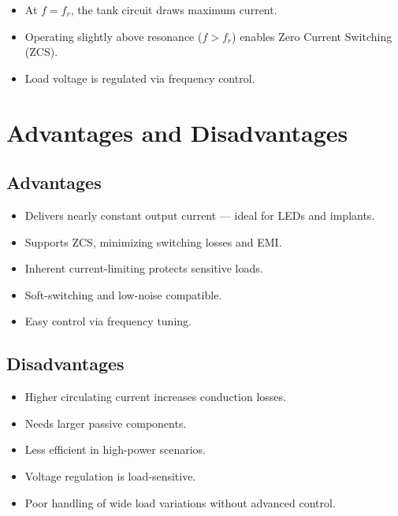 \documentclass[12pt,a4paper]{report}
\begin{document}
\begin{itemize}
    \item At \(f = f_r\), the tank circuit draws maximum current.
    \item Operating slightly above resonance (\(f > f_r\)) enables Zero Current Switching (ZCS).
    \item Load voltage is regulated via frequency control.
\end{itemize}



\section{Advantages and Disadvantages}

\subsection*{Advantages}

\begin{itemize}
    \item Delivers nearly constant output current — ideal for LEDs and implants.
    \item Supports ZCS, minimizing switching losses and EMI.
    \item Inherent current-limiting protects sensitive loads.
    \item Soft-switching and low-noise compatible.
    \item Easy control via frequency tuning.\cite{choi2020resonant}\cite{li2022singleended}\cite{lin2021analysis}
\end{itemize}

\subsection*{Disadvantages}
\begin{itemize}
    \item Higher circulating current increases conduction losses.
    \item Needs larger passive components.
    \item Less efficient in high-power scenarios.
    \item Voltage regulation is load-sensitive.
    \item Poor handling of wide load variations without advanced control.\cite{choi2020resonant}\cite{li2022singleended}\cite{lin2021analysis}
\end{itemize}
\end{document}
